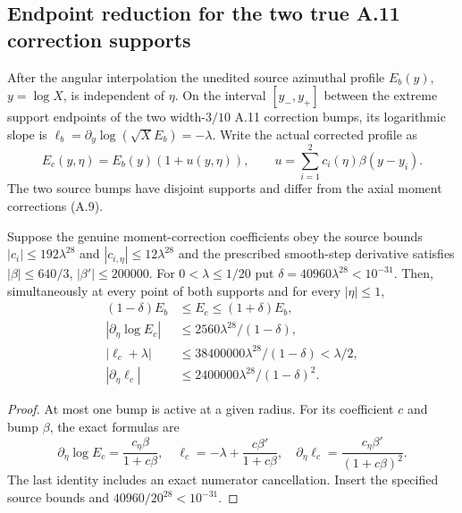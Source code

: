 \subsection*{Endpoint reduction for the two true A.11 correction supports}
After the angular interpolation the unedited source azimuthal profile
$E_b(y)$, $y=\log X$, is independent of $\eta$. On the interval
$[y_-,y_+]$ between the extreme support endpoints of the two
width-$3/10$ A.11 correction bumps, its logarithmic slope is
$\ell_b=\partial_y\log(\sqrt X E_b)=-\lambda$. Write the actual
corrected profile as
\[
 E_c(y,\eta)=E_b(y)(1+u(y,\eta)),\qquad
 u=\sum_{i=1}^2c_i(\eta)\beta(y-y_i).
\]
The two source bumps have disjoint supports and differ from the
axial moment corrections (A.9).

\begin{proposition}
\label{prop:a11-endpoint-jets}
Suppose the genuine moment-correction coefficients obey the source
bounds $|c_i|\le192\lambda^{28}$ and
$|c_{i,\eta}|\le12\lambda^{28}$ and the prescribed smooth-step
derivative satisfies $|\beta|\le640/3$, $|\beta'|\le200000$.
For $0<\lambda\le1/20$ put
$\delta=40960\lambda^{28}<10^{-31}$. Then, simultaneously at
every point of both supports and for every $|\eta|\le1$,
\begin{align*}
 (1-\delta)E_b&\le E_c\le(1+\delta)E_b,\\
 |\partial_\eta\log E_c|&\le
     2560\lambda^{28}/(1-\delta),\\
 |\ell_c+\lambda|&\le38400000\lambda^{28}/(1-\delta)
     <\lambda/2,\\
 |\partial_\eta\ell_c|&\le
     2400000\lambda^{28}/(1-\delta)^2.
\end{align*}
\end{proposition}
\begin{proof}
At most one bump is active at a given radius.
For its coefficient $c$ and bump $\beta$, the exact formulas are
\[
 \partial_\eta\log E_c=\frac{c_\eta\beta}{1+c\beta},
 \quad \ell_c=-\lambda+\frac{c\beta'}{1+c\beta},
 \quad\partial_\eta\ell_c=\frac{c_\eta\beta'}{(1+c\beta)^2}.
\]
The last identity includes an exact numerator cancellation.
Insert the specified source bounds and
$40960/20^{28}<10^{-31}$.
\end{proof}

